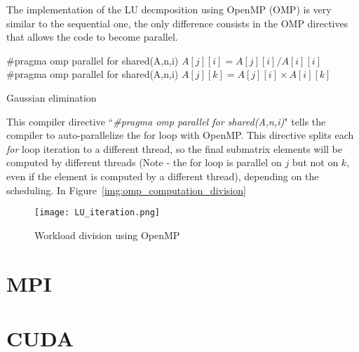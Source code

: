 The implementation of the LU decmposition using OpenMP (OMP) is very similar to the sequential one, the only difference consists in the OMP directives that allows the code to become parallel.

\begin{algorithm}
\begin{algorithmic}
	\State \#pragma omp parallel for shared(A,n,i)
		\State $A[j][i] = A[j][i] / A[i][i]$ 
	\EndFor
	\State \#pragma omp parallel for shared(A,n,i)
			\State $A[j][k] = A[j][i] \times A[i][k]$ 
		\EndFor	
	\EndFor
\EndFor
\end{algorithmic}
\caption{Gaussian elimination}
\label{alg:omp_code}
\end{algorithm}

This compiler directive ``\textit{\#pragma omp parallel for shared(A,n,i)}" tells the compiler to auto-parallelize the for loop with OpenMP. This directive splits each \textit{for} loop iteration to a different thread, so the final submatrix elements will be computed by different threads (Note - the for loop is parallel on $j$ but not on $k$, even if the element is computed by a different thread), depending on the scheduling. In Figure~\ref{img:omp_computation_division}


\begin{figure}[H]
\centering
\texttt{[image: LU\_iteration.png]}
\caption{Workload division using OpenMP}
\end{figure}



\section{MPI}
\section{CUDA}